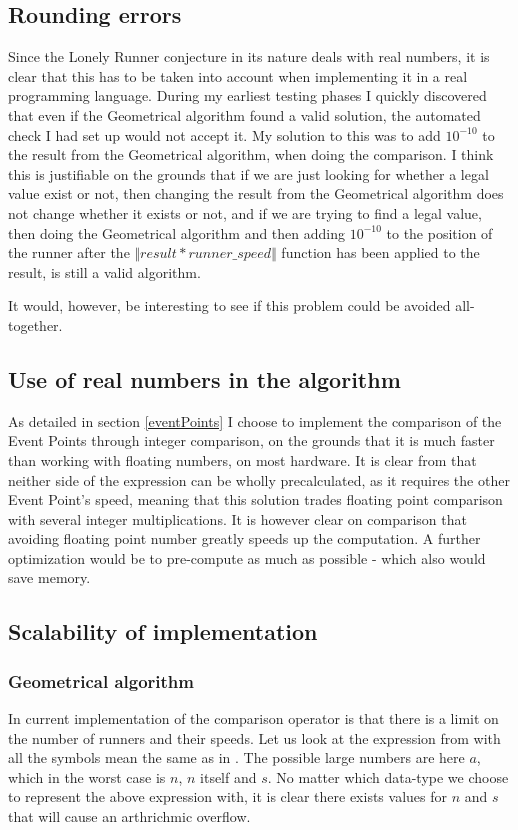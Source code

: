 \subsection{Rounding errors}
Since the Lonely Runner conjecture in its nature deals with real numbers, it is clear that this has to be taken into account when implementing it in a real programming language. During my earliest testing phases I quickly discovered that even if the Geometrical algorithm found a valid solution, the automated check I had set up would not accept it. My solution to this was to add $10^{-10}$ to the result from the Geometrical algorithm, when doing the comparison. I think this is justifiable on the grounds that if we are just looking for whether a legal value exist or not, then changing the result from the Geometrical algorithm does not change whether it exists or not, and if we are trying to find a legal value, then doing the Geometrical algorithm and then adding $10^{-10}$ to the position of the runner after the $\Vert result * runner\_speed \Vert$ function has been applied to the result, is still a valid algorithm.

It would, however, be interesting to see if this problem could be avoided all-together.

\subsection{Use of real numbers in the algorithm}
As detailed in section \ref{eventPoints} I choose to implement the comparison of the Event Points through integer comparison, on the grounds that it is much faster than working with floating numbers, on most hardware. It is clear from  that neither side of the expression can be wholly precalculated, as it requires the other Event Point's speed, meaning that this solution trades floating point comparison with several integer multiplications. It is however clear on comparison that avoiding floating point number greatly speeds up the computation. A further optimization would be to pre-compute as much as possible - which also would save memory.

\subsection{Scalability of implementation}
\label{scale}

\subsubsection{Geometrical algorithm}
In current implementation of the comparison operator is that there is a limit on the number of runners and their speeds. Let us look at the expression 
 from  with all the symbols mean the same as in . The possible large numbers are here $a$, which in the worst case is $n$, $n$ itself and $s$. No matter which data-type we choose to represent the above expression with, it is clear there exists values for $n$ and $s$ that will cause an arthrichmic overflow.

